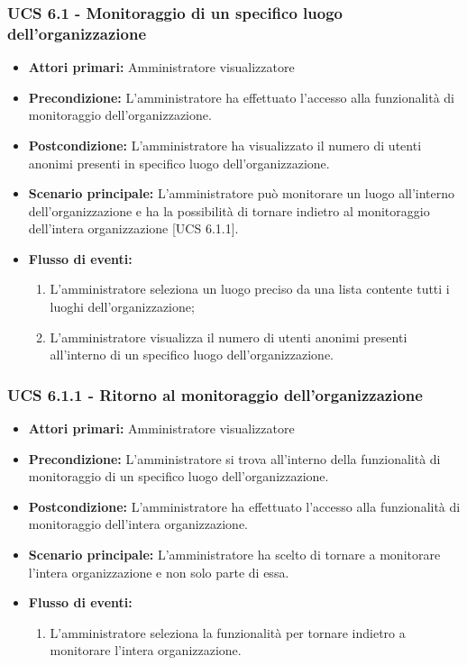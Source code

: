 \subsubsection{UCS 6.1 - Monitoraggio di un specifico luogo dell'organizzazione}
\begin{itemize}
	\item \textbf{Attori primari:} Amministratore visualizzatore
	\item \textbf{Precondizione:} L'amministratore ha effettuato l'accesso alla funzionalità di monitoraggio dell'organizzazione.
	\item \textbf{Postcondizione:} L'amministratore ha visualizzato il numero di utenti anonimi presenti in specifico luogo dell'organizzazione.
	\item \textbf{Scenario principale:} L'amministratore può monitorare un luogo all'interno dell'organizzazione e ha la possibilità di tornare indietro al monitoraggio dell'intera organizzazione [UCS 6.1.1].
	\item \textbf{Flusso di eventi:}
	\begin{enumerate}
	\item L'amministratore seleziona un luogo preciso da una lista contente tutti i luoghi dell'organizzazione;
	\item L'amministratore visualizza il numero di utenti anonimi presenti all'interno di un specifico luogo dell'organizzazione.
	\end{enumerate}
\end{itemize}

\subsubsection{UCS 6.1.1 - Ritorno al monitoraggio dell'organizzazione}
	\begin{itemize}
	\item \textbf{Attori primari:} Amministratore visualizzatore
	\item \textbf{Precondizione:} L'amministratore si trova all'interno della funzionalità di monitoraggio di un specifico luogo dell'organizzazione.
	\item \textbf{Postcondizione:} L'amministratore ha effettuato l'accesso alla funzionalità di monitoraggio dell'intera organizzazione.
	\item \textbf{Scenario principale:} L'amministratore ha scelto di tornare a monitorare l'intera organizzazione e non solo parte di essa.
	\item \textbf{Flusso di eventi:}
    \begin{enumerate}
        \item  L'amministratore seleziona la funzionalità per tornare indietro a monitorare l'intera organizzazione.
    \end{enumerate}
	\end{itemize}

